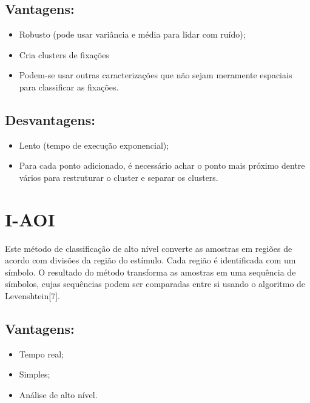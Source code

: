 \documentclass[brazil,]{report}
\begin{document}
\subsection{Vantagens:}\label{vantagens-3}

\begin{itemize}
\itemsep1pt\parskip0pt
\item
  Robusto (pode usar variância e média para lidar com ruído);
\item
  Cria clusters de fixações
\item
  Podem-se usar outras caracterizações que não sejam meramente espaciais
  para classificar as fixações.
\end{itemize}

\subsection{Desvantagens:}\label{desvantagens-3}

\begin{itemize}
\itemsep1pt\parskip0pt
\item
  Lento (tempo de execução exponencial);
\item
  Para cada ponto adicionado, é necessário achar o ponto mais próximo
  dentre vários para restruturar o cluster e separar os clusters.
\end{itemize}

\section{I-AOI}\label{i-aoi}

Este método de classificação de alto nível converte as amostras em
regiões de acordo com divisões da região do estímulo. Cada região é
identificada com um símbolo. O resultado do método transforma as
amostras em uma sequência de símbolos, cujas sequências podem ser
comparadas entre si usando o algoritmo de Levenshtein{[}7{]}.

\subsection{Vantagens:}\label{vantagens-4}

\begin{itemize}
\itemsep1pt\parskip0pt
\item
  Tempo real;
\item
  Simples;
\item
  Análise de alto nível.
\end{itemize}
\end{document}
